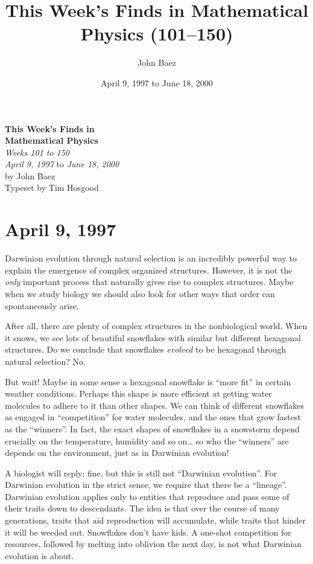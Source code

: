 \documentclass{article}
\title{This Week's Finds in Mathematical Physics (101--150)}
\author{John Baez}
\date{April 9, 1997 to June 18, 2000}
\begin{document}
\begin{titlepage}
  \begin{center}
    {\Huge\textbf{This Week's Finds in}}
  \\[0.7em]{\Huge\textbf{Mathematical Physics}}
  \\[1em]{\huge\textit{Weeks 101 to 150}}
  \\[4em]{\LARGE \textit{April 9, 1997} to \textit{June 18, 2000}}
  \\[4em]{\huge by John Baez}
  \\[0.5em]{\Large{Typeset by Tim Hosgood}}
  \end{center}
\end{titlepage}

\tableofcontents

\hypertarget{week101}{%
\section{April 9, 1997}\label{week101}}

Darwinian evolution through natural selection is an incredibly powerful
way to explain the emergence of complex organized structures. However,
it is not the \emph{only} important process that naturally gives rise to
complex structures. Maybe when we study biology we should also look for
other ways that order can spontaneously arise.

After all, there are plenty of complex structures in the nonbiological
world. When it snows, we see lots of beautiful snowflakes with similar
but different hexagonal structures. Do we conclude that snowflakes
\emph{evolved} to be hexagonal through natural selection? No.

But wait! Maybe in some sense a hexagonal snowflake is ``more fit'' in
certain weather conditions. Perhaps this shape is more efficient at
getting water molecules to adhere to it than other shapes. We can think
of different snowflakes as engaged in ``competition'' for water
molecules, and the ones that grow fastest as the ``winners''. In fact,
the exact shapes of snowflakes in a snowstorm depend crucially on the
temperature, humidity and so on\ldots{} so who the ``winners'' are
depends on the environment, just as in Darwinian evolution!

A biologist will reply: fine, but this is still not ``Darwinian
evolution''. For Darwinian evolution in the strict sense, we require
that there be a ``lineage''. Darwinian evolution applies only to
entities that reproduce and pass some of their traits down to
descendants. The idea is that over the course of many generations,
traits that aid reproduction will accumulate, while traits that hinder
it will be weeded out. Snowflakes don't have kids. A one-shot
competition for resources, followed by melting into oblivion the next
day, is not what Darwinian evolution is about.
\end{document}
